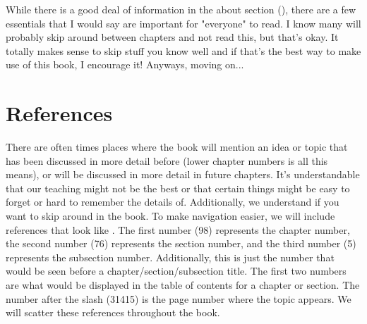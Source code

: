 \documentclass[../OpenAppliedMusicTheory.tex]{subfiles}
\begin{document}
    
    
    While there is a good deal of information in the about section (), there are a few essentials that I would say are important for "everyone" to read. I know many will probably skip around between chapters and not read this, but that's okay. It totally makes sense to skip stuff you know well and if that's the best way to make use of this book, I encourage it! Anyways, moving on...
    
    \section{References}\label{ch.0:references}

    There are often times places where the book will mention an idea or topic that has been discussed in more detail before (lower chapter numbers is all this means), or will be discussed in more detail in future chapters. It's understandable that our teaching might not be the best or that certain things might be easy to forget or hard to remember the details of. Additionally, we understand if you want to skip around in the book. To make navigation easier, we will include references that look like . The first number (98) represents the chapter number, the second number (76) represents the section number, and the third number (5) represents the subsection number. Additionally, this is just the number that would be seen before a chapter/section/subsection %
     title. The first two numbers are what would be displayed in the table of contents for a chapter or section. The number after the slash (31415) is the page number where the topic appears. We will scatter these references throughout the book.
\end{document}
